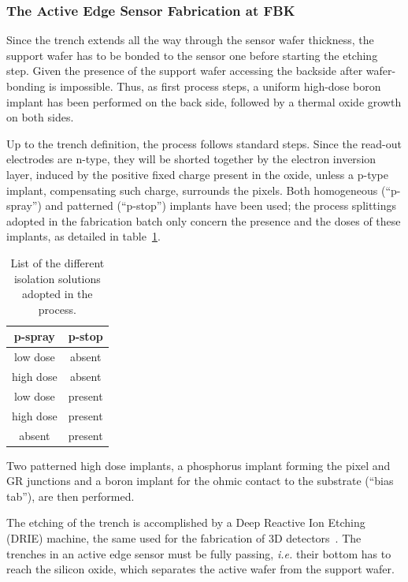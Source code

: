 \subsubsection{The Active Edge Sensor Fabrication at FBK}
Since the trench extends all the way through the sensor wafer thickness, the support wafer has to 
be bonded to the sensor one before starting the etching step.
Given the presence of the  support wafer  accessing the backside  after wafer-bonding is impossible.
Thus, as first process steps, a uniform high-dose boron implant has been performed on the back side, 
followed by a thermal oxide growth on
both sides.

Up to the trench definition, the process follows standard steps. Since the read-out electrodes are n-type, they will be shorted together by the electron
inversion layer, induced by the positive fixed charge present in the oxide, unless a p-type implant, compensating such charge, surrounds the pixels.
Both homogeneous (``p-spray'') and patterned (``p-stop'') implants have been used;
the process splittings adopted in the fabrication batch only concern the presence and the doses of these implants,  as detailed in table~\ref{tab:isolation}.



\begin{table}[!htpb]
\caption{\label{tab:isolation}List of the different isolation solutions adopted in the process.}
\begin{center}
\begin{tabular}{cc}
\hline
p-spray    & p-stop \\
\hline
\hline
  low dose &      absent\\
  high   dose  &   absent\\
  low   dose &     present\\
  high  dose  &   present\\
  absent  &   present
\end{tabular}
\end{center}
\end{table}

Two patterned high dose implants, a  phosphorus implant forming the pixel and GR junctions  and a boron implant for  the ohmic contact
 to the substrate (``bias tab''), are then performed.

The etching of the trench is accomplished by a Deep Reactive Ion Etching (DRIE) machine, the same used for the fabrication of
3D detectors~\cite{bib:3DFBK}. The trenches in an active edge sensor must be fully passing, {\it i.e.} their bottom  has to reach  the silicon oxide, which separates the active wafer from the 
support wafer.


